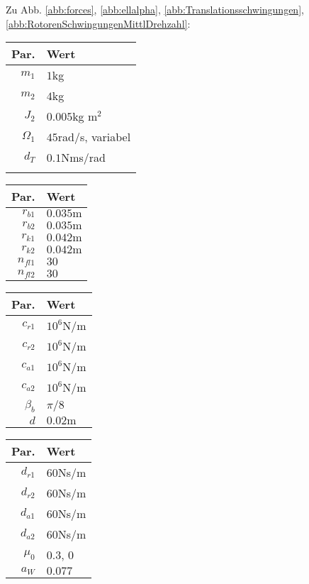 Zu Abb. \ref{abb:forces}, \ref{abb:ellalpha}, \ref{abb:Translationsschwingungen}, \ref{abb:RotorenSchwingungenMittlDrehzahl}:
\begin{center}
\begin{tabular}{r|l}
Par.&Wert\\\hline
$m_1 $&$1$kg\\
$m_2 $&$ 4$kg\\
$J_2 $&$ 0.005$kg m$^2$\\
$\Omega_1$&$45$rad/s, variabel\\
$d_T$&$0.1$Nms/rad\\
&\\
\end{tabular}\hfill
\begin{tabular}{r|l}
Par.&Wert\\\hline
$r_{b1}$&$0.035\textrm{m}$\\
$r_{b2}$&$0.035\textrm{m}$\\
$r_{k1}$&$0.042\textrm{m}$\\
$r_{k2}$&$0.042\textrm{m}$\\
$n_{fl1}$&$30$\\
$n_{fl2}$&$30$\\
\end{tabular}\hfill
\begin{tabular}{r|l}
Par.&Wert\\\hline
$c_{r1}$&$10^{6}$N/m\\
$c_{r2}$&$10^{6}$N/m\\
$c_{a1}$&$10^{6}$N/m\\
$c_{a2}$&$10^{6}$N/m\\
$\beta_b $&$ \pi/8$\\
$d $&$ 0.02\textrm{m}$ \\
\end{tabular}\hfill
\begin{tabular}{r|l}
Par.&Wert\\\hline
$d_{r1}$&$60$Ns/m\\
$d_{r2}$&$60$Ns/m\\
$d_{a1}$&$60$Ns/m\\
$d_{a2}$&$60$Ns/m\\
$\mu_0$&$0.3$, $0$\\
$a_W $&$ 0.077$\\
\end{tabular}
\end{center}

